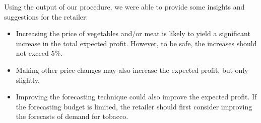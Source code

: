 \documentclass[a4paper,11pt]{article}
\begin{document}
\begin{table}[htb]
\centering
\caption{Margins of profit and Bounds for ranges of validity in \%}
\label{tab:real_sum}
\end{table}

Using the output of our procedure, we were able to provide some insights and suggestions for the retailer:
\begin{itemize}
\item Increasing the price of vegetables and/or meat is likely to yield a significant increase in the total expected profit. However, to be safe, the increases should not exceed 5\%.
\item Making other price changes may also increase the expected profit, but only slightly.
\item Improving the forecasting technique could also improve the expected profit. If the forecasting budget is limited, the retailer should first consider improving the forecasts of demand for tobacco.
\end{itemize}
\end{document}

